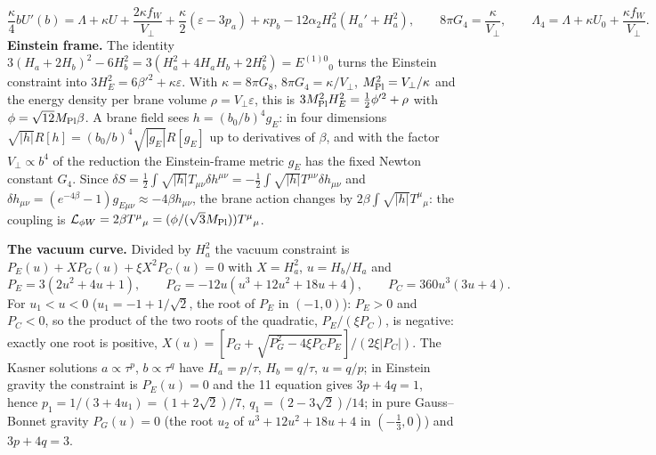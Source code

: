 \documentclass[10pt,a4paper]{article}
\begin{document}
\begin{equation*}
\frac\kappa4bU'(b)=\Lambda+\kappa U+\frac{2\kappa f_W}{V_\perp}+\frac\kappa2(\varepsilon-3p_a)+\kappa p_b-12\alpha_2H_a^2(H_a'+H_a^2),\qquad 8\pi G_4=\frac\kappa{V_\perp},\qquad \Lambda_4=\Lambda+\kappa U_0+\frac{\kappa f_W}{V_\perp}.
\end{equation*}
\textbf{Einstein frame.} The identity $3(H_a+2H_b)^2-6H_b^2=3(H_a^2+4H_aH_b+2H_b^2)=E^{(1)0}{}_0$ turns the Einstein constraint into $3H_E^2=6\beta'^2+\kappa\varepsilon$. With $\kappa=8\pi G_8$, $8\pi G_4=\kappa/V_\perp$, $M_{\rm Pl}^2=V_\perp/\kappa$ and the energy density per brane volume $\rho=V_\perp\varepsilon$, this is $3M_{\rm Pl}^2H_E^2=\tfrac12\phi'^2+\rho$ with $\phi=\sqrt{12}M_{\rm Pl}\beta$. A brane field sees $h=(b_0/b)^4g_E$: in four dimensions $\sqrt{|h|}R[h]=(b_0/b)^4\sqrt{|g_E|}R[g_E]$ up to derivatives of $\beta$, and with the factor $V_\perp\propto b^4$ of the reduction the Einstein-frame metric $g_E$ has the fixed Newton constant $G_4$. Since $\delta S=\tfrac12\int\sqrt{|h|}T_{\mu\nu}\delta h^{\mu\nu}=-\tfrac12\int\sqrt{|h|}T^{\mu\nu}\delta h_{\mu\nu}$ and $\delta h_{\mu\nu}=(e^{-4\beta}-1)g_{E\mu\nu}\approx-4\beta h_{\mu\nu}$, the brane action changes by $2\beta\int\sqrt{|h|}T^\mu{}_\mu$: the coupling is $\mathcal L_{\phi W}=2\beta T^\mu{}_\mu=(\phi/(\sqrt3M_{\rm Pl}))T^\mu{}_\mu$.

\textbf{The vacuum curve.} Divided by $H_a^2$ the vacuum constraint is $P_E(u)+XP_G(u)+\xi X^2P_C(u)=0$ with $X=H_a^2$, $u=H_b/H_a$ and
\begin{equation*}
P_E=3(2u^2+4u+1),\qquad P_G=-12u(u^3+12u^2+18u+4),\qquad P_C=360u^3(3u+4).
\end{equation*}
For $u_1<u<0$ ($u_1=-1+1/\sqrt2$, the root of $P_E$ in $(-1,0)$): $P_E>0$ and $P_C<0$, so the product of the two roots of the quadratic, $P_E/(\xi P_C)$, is negative: exactly one root is positive, $X(u)=[P_G+\sqrt{P_G^2-4\xi P_CP_E}]/(2\xi|P_C|)$. The Kasner solutions $a\propto\tau^p$, $b\propto\tau^q$ have $H_a=p/\tau$, $H_b=q/\tau$, $u=q/p$; in Einstein gravity the constraint is $P_E(u)=0$ and the 11 equation gives $3p+4q=1$, hence $p_1=1/(3+4u_1)=(1+2\sqrt2)/7$, $q_1=(2-3\sqrt2)/14$; in pure Gauss–Bonnet gravity $P_G(u)=0$ (the root $u_2$ of $u^3+12u^2+18u+4$ in $(-\tfrac13,0)$) and $3p+4q=3$.
\end{document}
